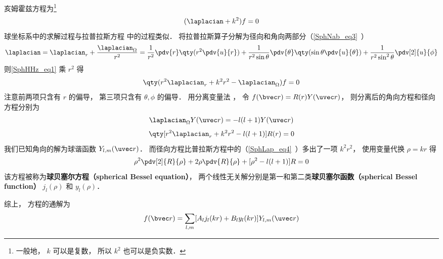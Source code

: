 

亥姆霍兹方程为\footnote{一般地， $k$ 可以是复数， 所以 $k^2$ 也可以是负实数．}
\begin{equation}\label{SphHHz_eq1}
(\laplacian + k^2)f = 0
\end{equation}
球坐标系中的求解过程与拉普拉斯方程 中的过程类似． 将拉普拉斯算子分解为径向和角向两部分（\autoref{SphNab_eq3}~）
\begin{equation}
\laplacian = \laplacian_r + \frac{\laplacian_{\Omega}}{r^2} = \frac{1}{r^2} \pdv{r} \qty(r^2 \pdv{u}{r}) + \frac{1}{r^2\sin\theta}\pdv{\theta} \qty(\sin \theta \pdv{u}{\theta}) + \frac{1}{r^2\sin^2 \theta} \pdv[2]{u}{\phi}
\end{equation}
则\autoref{SphHHz_eq1} 乘 $r^2$ 得
\begin{equation}
\qty(r^2\laplacian_r + k^2 r^2 - \laplacian_\Omega) f = 0
\end{equation}
注意前两项只含有 $r$ 的偏导， 第三项只含有 $\theta,\phi$ 的偏导． 用分离变量法 %
， 令 $f(\bvec r) = R(r) Y(\uvec r)$， 则分离后的角向方程和径向方程分别为
\begin{equation}
\laplacian_{\Omega} Y(\uvec r) = -l(l+1) Y(\uvec r)
\end{equation}
\begin{equation}
\qty[r^2\laplacian_r + k^2 r^2 - l(l+1)] R(r) = 0
\end{equation}
我们已知角向的解为球谐函数 $Y_{l,m}(\uvec r)$． 而径向方程比普拉斯方程中的（\autoref{SphLap_eq4}~）多出了一项 $k^2r^2$， 使用变量代换 $\rho = kr$ 得
\begin{equation}
\rho^2\pdv[2]{R}{\rho} + 2\rho\pdv{R}{\rho} + [\rho^2 - l(l+1)] R = 0
\end{equation}
该方程被称为\textbf{球贝塞尔方程（spherical Bessel equation）}， 两个线性无关解分别是第一和第二类\textbf{球贝塞尔函数（spherical Bessel function）} $j_l(\rho)$ 和 $y_l(\rho)$．

综上， 方程的通解为
\begin{equation}
f(\bvec r) = \sum_{l,m} [A_l j_l(kr) + B_l y_l(kr)] Y_{l,m}(\uvec r)
\end{equation}
